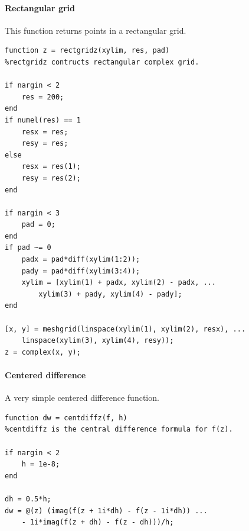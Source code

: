 \documentclass[12pt,fleqn]{article}
\begin{document}
\paragraph{Rectangular grid}
This function returns points in a rectangular grid.
\begin{lstlisting}
function z = rectgridz(xylim, res, pad)
%rectgridz contructs rectangular complex grid.

if nargin < 2
    res = 200;
end
if numel(res) == 1
    resx = res;
    resy = res;
else
    resx = res(1);
    resy = res(2);
end

if nargin < 3
    pad = 0;
end
if pad ~= 0
    padx = pad*diff(xylim(1:2));
    pady = pad*diff(xylim(3:4));
    xylim = [xylim(1) + padx, xylim(2) - padx, ...
        xylim(3) + pady, xylim(4) - pady];
end

[x, y] = meshgrid(linspace(xylim(1), xylim(2), resx), ...
    linspace(xylim(3), xylim(4), resy));
z = complex(x, y);
\end{lstlisting}

\paragraph{Centered difference}
A very simple centered difference function.
\begin{lstlisting}
function dw = centdiffz(f, h)
%centdiffz is the central difference formula for f(z).

if nargin < 2
    h = 1e-8;
end

dh = 0.5*h;
dw = @(z) (imag(f(z + 1i*dh) - f(z - 1i*dh)) ...
    - 1i*imag(f(z + dh) - f(z - dh)))/h;
\end{lstlisting}
\end{document}
